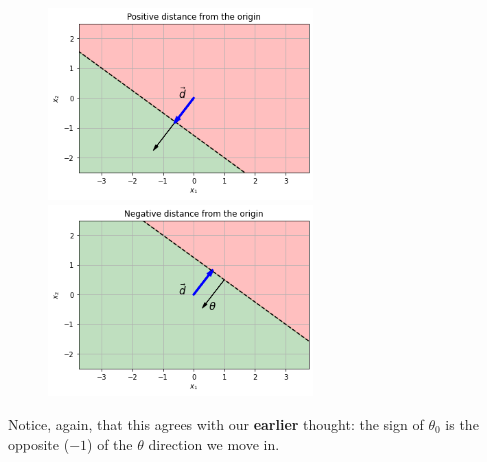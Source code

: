         \begin{figure}[H]
            \includegraphics[width=70mm,scale=0.5]{images/classification_images/positive_distance.png}
            \includegraphics[width=70mm,scale=0.5]{images/classification_images/negative_distance.png}
            
        \end{figure}
        
        Notice, again, that this agrees with our \textbf{earlier} thought: the sign of $\theta_0$ is the opposite ($-1$) of the $\theta$ direction we move in.